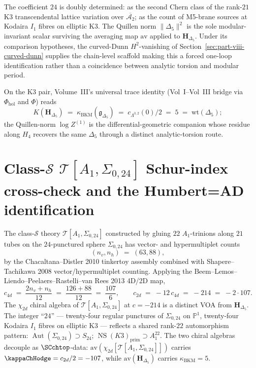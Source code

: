 The coefficient $24$ is doubly determined: as the second Chern class
of the rank-$21$ K3 transcendental lattice variation over
$\overline{\mathcal{A}_2}$; as the count of M5-brane sources at
Kodaira $I_1$ fibres on elliptic K3. The Quillen norm $\|\Delta_5\|^2$
is the sole modular-invariant scalar surviving the averaging map
$\mathrm{av}$ applied to $\mathbf{H}_{\Delta_5}$. Under its comparison
hypotheses, the curved-Dunn $H^2$-vanishing of
Section~\ref{sec:part-viii-curved-dunn} supplies the chain-level
scaffold making this a forced one-loop identification rather than a
coincidence between analytic torsion and modular period.

On the K3 pair, Volume~III's universal trace identity (Vol~I--Vol~III
bridge via $\Phi_{\mathrm{hol}}$ and $\Phi$) reads
\[
K(\mathbf{H}_{\Delta_5})
\;=\;
\kappa_{\mathrm{BKM}}(\mathfrak{g}_{\Delta_5})
\;=\;
c_{\Lambda^{3,2}}(0)/2
\;=\;
5
\;=\;
\mathrm{wt}(\Delta_5);
\]
the Quillen-norm $\log Z^{(1)}$ is the differential-geometric companion
whose residue along $H_4$ recovers the same $\Delta_5$ through a
distinct analytic-torsion route.

\section{Class-$\mathcal{S}$ $\mathcal{T}[A_1,\Sigma_{0,24}]$ Schur-index
cross-check and the Humbert=AD identification}
\label{sec:part-viii-schur-humbert}

The class-$\mathcal{S}$ theory
$\mathcal{T}[A_1, \Sigma_{0,24}]$ constructed by gluing $22$
$A_1$-trinions along $21$ tubes on the $24$-punctured sphere
$\Sigma_{0,24}$ has vector- and hypermultiplet counts
\[
(n_v, n_h)
\;=\;
(63, 88),
\]
by the Chacaltana--Distler 2010 tinkertoy assembly combined with
Shapere--Tachikawa 2008 vector/hypermultiplet counting. Applying the
Beem--Lemos--Liendo--Peelaers--Rastelli--van Rees 2013 4D/2D map,
\[
c_{4d}
\;=\;
\frac{2n_v + n_h}{12}
\;=\;
\frac{126+88}{12}
\;=\;
\frac{107}{6},
\qquad
c_{2d}
\;=\;
-12\,c_{4d}
\;=\;
-214
\;=\;
-2\cdot 107.
\]
The $\chi_{2d}$ chiral algebra of $\mathcal{T}[A_1,\Sigma_{0,24}]$ at
$c = -214$ is a distinct VOA from $\mathbf{H}_{\Delta_5}$. The
integer ``$24$'' — twenty-four regular punctures of $\Sigma_{0,24}$
on $\mathbb{P}^1$, twenty-four Kodaira $I_1$ fibres on elliptic K3 —
reflects a shared rank-$22$ automorphism pattern:
$\operatorname{Aut}(\Sigma_{0,24})\supset S_{24}$;
$\operatorname{NS}(K3)_{\mathrm{prim}}\supset A_1^{22}$. The two chiral
algebras decouple as $\SCchtop$-data:
$\mathrm{av}(\chi_{2d}[\mathcal{T}[A_1,\Sigma_{0,24}]])$ carries
$\kappaChHodge = c_{2d}/2 = -107$, while
$\mathrm{av}(\mathbf{H}_{\Delta_5})$ carries $\kappa_{\mathrm{BKM}} = 5$.


